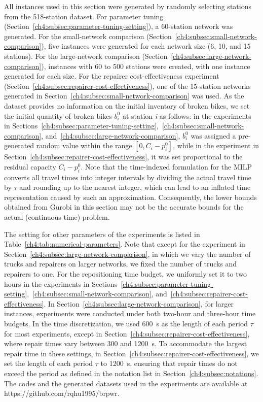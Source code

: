 All instances used in this section were generated by randomly selecting stations
from the 518-station dataset. For parameter tuning
(Section~\ref{ch4:subsec:parameter-tuning-setting}), a 60-station network was
generated. For the small-network comparison
(Section~\ref{ch4:subsec:small-network-comparison}), five instances were
generated for each network size (6, 10, and 15 stations). For the large-network
comparison (Section~\ref{ch4:subsec:large-network-comparison}), instances with
60 to 500 stations were created, with one instance generated for each size. For
the repairer cost-effectiveness experiment
(Section~\ref{ch4:subsec:repairer-cost-effectiveness}), one of the 15-station
networks generated in Section~\ref{ch4:subsec:small-network-comparison} was used. As
the dataset provides no information on the initial inventory of broken bikes, we set the initial
quantity of broken bikes \(b_{i}^{0}\) at station \emph{i} as follows: in the experiments in
Sections~\ref{ch4:subsec:parameter-tuning-setting},~\ref{ch4:subsec:small-network-comparison},
and~\ref{ch4:subsec:large-network-comparison}, \(b_{i}^{0}\) was
assigned a pre-generated random value within the range
\(\left\lbrack {0,C_{i} - p_{i}^{0}} \right\rbrack\), while in the experiment in Section~\ref{ch4:subsec:repairer-cost-effectiveness}, it was
set proportional to the residual capacity \(C_{i} - p_{i}^{0}\). Note that the time-indexed
formulation for the MILP converts all travel times into integer intervals by dividing the actual
travel time by \emph{\(\tau\)} and rounding up to the nearest integer, which can lead to an inflated time
representation caused by such an approximation. Consequently, the lower bounds obtained from Gurobi
in this section may not be the accurate bounds for the actual (continuous-time) problem.

The setting for other parameters of the experiments is listed in Table~\ref{ch4:tab:numerical-parameters}. Note that except for the
experiment in Section~\ref{ch4:subsec:large-network-comparison}, in which we vary the number of trucks and repairers on larger networks,
we fixed the number of trucks and repairers to one. For the repositioning time budget, we uniformly
set it to two hours in the experiments in
Sections~\ref{ch4:subsec:parameter-tuning-setting},~\ref{ch4:subsec:small-network-comparison},
and~\ref{ch4:subsec:repairer-cost-effectiveness}. In Section~\ref{ch4:subsec:large-network-comparison}, for larger instances,
experiments were conducted under both two-hour and three-hour time budgets. In the time
discretization, we used 600~s as the length of each period \emph{\(\tau\)} for most experiments, except in
Section~\ref{ch4:subsec:repairer-cost-effectiveness}, where repair times vary between 300 and 1200~s. To accommodate the largest repair time
in these settings, in Section~\ref{ch4:subsec:repairer-cost-effectiveness}, we set the length of each period \emph{\(\tau\)} to 1200~s, ensuring
that repair times do not exceed the period as defined in the notation list in Section~\ref{ch4:subsec:notations}. The codes
and the generated datasets used in the experiments are available at
https://github.com/rqhu1995/brpwr.

